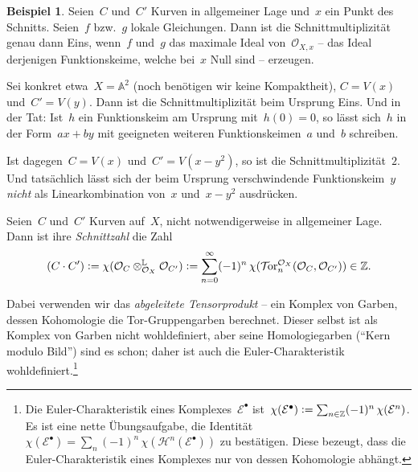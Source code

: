 \documentclass[a4paper,ngerman,12pt]{scrartcl}
\theoremstyle{definition}
\newtheorem{ex}[defn]{Beispiel}
\theoremstyle{plain}
\theoremstyle{remark}
\renewcommand{\AA}{\mathbb{A}}
\newcommand{\ZZ}{\mathbb{Z}}
\newcommand{\E}{\mathcal{E}}
\renewcommand{\H}{\mathcal{H}}
\renewcommand{\O}{\mathcal{O}}
\newcommand{\defeq}{\vcentcolon=}
\begin{document}
\begin{ex}Seien~$C$ und~$C'$ Kurven in allgemeiner Lage und~$x$ ein Punkt des
Schnitts. Seien~$f$ bzw.~$g$ lokale Gleichungen. Dann ist die
Schnittmultiplizität genau dann Eins, wenn~$f$ und~$g$ das maximale Ideal
von~$\O_{X,x}$ -- das Ideal derjenigen Funktionskeime, welche bei~$x$
Null sind -- erzeugen.

Sei konkret etwa~$X = \AA^2$ (noch benötigen wir keine
Kompaktheit), $C = V(x)$ und~$C' = V(y)$. Dann ist die Schnittmultiplizität
beim Ursprung Eins. Und in der Tat: Ist~$h$ ein Funktionskeim am
Ursprung mit~$h(0) = 0$, so lässt sich~$h$ in der Form~$ax + by$ mit geeigneten
weiteren Funktionskeimen~$a$ und~$b$ schreiben.

Ist dagegen~$C = V(x)$ und~$C' = V(x - y^2)$, so ist die
Schnittmultiplizität~$2$. Und tatsächlich lässt sich der beim Ursprung
verschwindende Funktionskeim~$y$ \emph{nicht} als Linearkombination von~$x$
und~$x-y^2$ ausdrücken.
\end{ex}

\begin{defn}Seien~$C$ und~$C'$ Kurven auf~$X$, nicht notwendigerweise in
allgemeiner Lage. Dann ist ihre \emph{Schnittzahl} die Zahl
\[ (C \cdot C') \defeq \chi(\O_C \otimes_{\O_X}^{\mathbb{L}} \O_{C'}) \defeq
  \sum_{n = 0}^\infty (-1)^n \, \chi(\mathcal{T}\!\mathrm{or}^{\O_X}_n(\O_C,\O_{C'})) \in \ZZ. \]
\end{defn}

Dabei verwenden wir das \emph{abgeleitete Tensorprodukt} -- ein Komplex von
Garben, dessen Kohomologie die Tor-Gruppengarben berechnet. Dieser selbst ist als
Komplex von Garben nicht wohldefiniert, aber seine Homologiegarben ("`Kern
modulo Bild"') sind es schon; daher ist auch die Euler-Charakteristik
wohldefiniert.\footnote{Die Euler-Charakteristik eines Komplexes~$\E^\bullet$
ist~$\chi(\E^\bullet) \defeq \sum_{n \in \ZZ} (-1)^n \,\chi(\E^n)$. Es ist eine
nette Übungsaufgabe, die Identität~$\chi(\E^\bullet) = \sum_n (-1)^n
\,\chi(\H^n(\E^\bullet))$ zu bestätigen. Diese bezeugt, dass die
Euler-Charakteristik eines Komplexes nur von dessen Kohomologie abhängt.}
\end{document}
